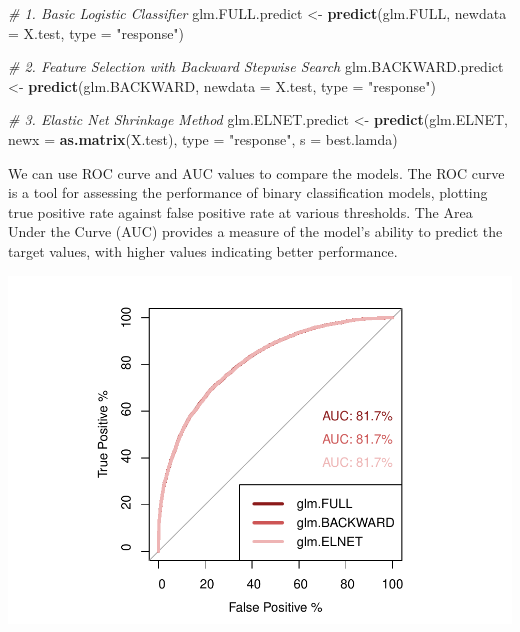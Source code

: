 \documentclass[
  10pt,
  paper=a4,
  ,captions=tableheading
]{scrartcl}
\newenvironment{Shaded}{\begin{snugshade}}{\end{snugshade}}
\newcommand{\AttributeTok}[1]{\textcolor[rgb]{0.13,0.29,0.53}{#1}}
\newcommand{\CommentTok}[1]{\textcolor[rgb]{0.56,0.35,0.01}{\textit{#1}}}
\newcommand{\FunctionTok}[1]{\textcolor[rgb]{0.13,0.29,0.53}{\textbf{#1}}}
\newcommand{\NormalTok}[1]{#1}
\newcommand{\OtherTok}[1]{\textcolor[rgb]{0.56,0.35,0.01}{#1}}
\newcommand{\StringTok}[1]{\textcolor[rgb]{0.31,0.60,0.02}{#1}}
\begin{document}
\small

\begin{Shaded}
\begin{Highlighting}[]
\CommentTok{\# 1. Basic Logistic Classifier}
\NormalTok{glm.FULL.predict }\OtherTok{\textless{}{-}} \FunctionTok{predict}\NormalTok{(glm.FULL, }\AttributeTok{newdata =}\NormalTok{ X.test, }\AttributeTok{type =} \StringTok{"response"}\NormalTok{)}

\CommentTok{\# 2. Feature Selection with Backward Stepwise Search}
\NormalTok{glm.BACKWARD.predict }\OtherTok{\textless{}{-}} \FunctionTok{predict}\NormalTok{(glm.BACKWARD, }\AttributeTok{newdata =}\NormalTok{ X.test, }\AttributeTok{type =} \StringTok{"response"}\NormalTok{)}

\CommentTok{\# 3. Elastic Net Shrinkage Method}
\NormalTok{glm.ELNET.predict }\OtherTok{\textless{}{-}} \FunctionTok{predict}\NormalTok{(glm.ELNET, }\AttributeTok{newx =} \FunctionTok{as.matrix}\NormalTok{(X.test), }\AttributeTok{type =} \StringTok{"response"}\NormalTok{,}
    \AttributeTok{s =}\NormalTok{ best.lamda)}
\end{Highlighting}
\end{Shaded}

\small

We can use ROC curve and AUC values to compare the models. The ROC curve
is a tool for assessing the performance of binary classification models,
plotting true positive rate against false positive rate at various
thresholds. The Area Under the Curve (AUC) provides a measure of the
model's ability to predict the target values, with higher values
indicating better performance.

\small

\includegraphics{figs/roc_auc-1.pdf}
\end{document}
